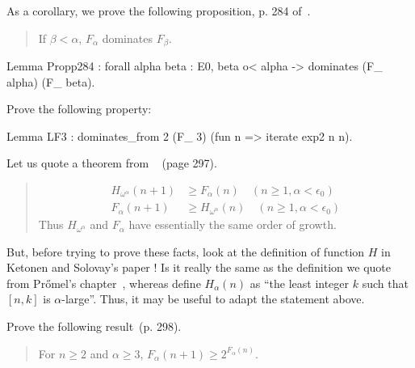 As a corollary, we prove the following proposition, p. 284 of~\cite{KS81}.

\begin{quote}
  If $\beta<\alpha$, $F_\alpha$ dominates $F_\beta$.
\end{quote}

\begin{Coqsrc}
Lemma Propp284 : forall alpha beta : E0, 
   beta o< alpha -> dominates (F_ alpha) (F_ beta).
\end{Coqsrc}


\begin{exercise}
Prove the following property:

\begin{Coqsrc}
Lemma LF3 : dominates_from  2 (F_ 3) (fun  n => iterate exp2 n n).
\end{Coqsrc}
\end{exercise}


\begin{exercise}
Let us quote a theorem from ~\cite{KS81} (page 297).

\begin{quote}
\begin{align*}
  H_{\omega^\alpha}(n+1) &\geq F_{\alpha}(n) \quad (n\geq 1, \alpha<\epsilon_0) \\
 F_{\alpha}(n+1) &\geq H_{\omega^\alpha}(n) \quad (n\geq 1, \alpha<\epsilon_0) 
\end{align*}
Thus $H_{\omega^\alpha}$ and $F_{\alpha}$ have essentially the same order of growth.

\end{quote}

 But, before trying to prove these facts, look at the definition of function $H$ in Ketonen and Solovay's paper ! Is it really the same as the definition we quote from Pr{\H o}mel's chapter~\cite{Promel2013},
whereas \cite{KS81} define $H_\alpha(n)$ as ``the least integer $k$ such that $[n,k]$ is $\alpha$-large''. Thus, it may be useful to adapt the statement above.



\end{exercise}


\begin{exercise}
Prove the following result~\cite{KS81}(p. 298).

\begin{quote}
   For $n\geq 2$ and $\alpha \geq 3$, $F_\alpha(n+1)\geq 2^{F_\alpha(n)}$.
\end{quote}
\end{exercise}



